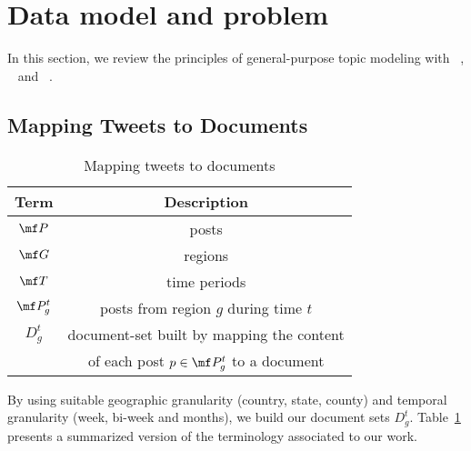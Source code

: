 \section{Data model and problem}
\label{sec:background}
In this section, we review the principles of general-purpose topic modeling with \lda~\cite{lda}, \tmlda~\cite{DBLP:conf/kdd/WangAB12} and \atam~\cite{atam2}.
\subsection{Mapping Tweets to Documents}
\begin{table}[b!]
\centering
\caption{Mapping tweets to documents}
\label{tab:model:terms}
\begin{tabular}{|c|c|}
\hline
{\bf Term} & {\bf Description}\\
\hline
$\mf P$ & posts\\
\hline
$\mf G$ & regions\\
\hline
$\mf T$ & time periods\\
\hline
$\mf P_g^t$ & posts from region $g$ during time $t$\\
\hline
$D_g^t$ & document-set built by mapping the content\\
& of each post $p\in \mf P_g^t$ to a document\\
\hline
\end{tabular}
\end{table}
By using suitable  geographic granularity (country, state, county) and temporal granularity (week, bi-week and months), we build our document sets  $D_g^t$.
Table~\ref{tab:model:terms} presents a summarized
version of the terminology associated to our work.

